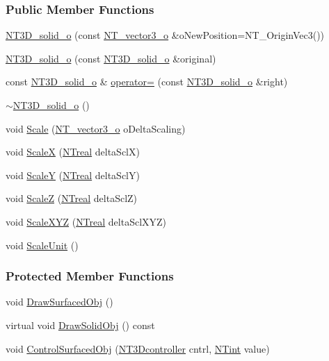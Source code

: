 \subsubsection*{Public Member Functions}
\begin{DoxyCompactItemize}
\item 
\hyperlink{class_n_t3_d__solid__o_a95fd6fbeb0b612c8076cb0bbf4b9b41e}{NT3D\_\-solid\_\-o} (const \hyperlink{class_n_t__vector3__o}{NT\_\-vector3\_\-o} \&oNewPosition=NT\_\-OriginVec3())
\item 
\hyperlink{class_n_t3_d__solid__o_a6c4325811642226e86ef613d57dd89b1}{NT3D\_\-solid\_\-o} (const \hyperlink{class_n_t3_d__solid__o}{NT3D\_\-solid\_\-o} \&original)
\item 
const \hyperlink{class_n_t3_d__solid__o}{NT3D\_\-solid\_\-o} \& \hyperlink{class_n_t3_d__solid__o_a4bd17ed59cee41950353aafa6dba9786}{operator=} (const \hyperlink{class_n_t3_d__solid__o}{NT3D\_\-solid\_\-o} \&right)
\item 
\hyperlink{class_n_t3_d__solid__o_ac68c10afb83bc16ecae8c220aa0496f8}{$\sim$NT3D\_\-solid\_\-o} ()
\item 
void \hyperlink{class_n_t3_d__solid__o_aecc87253889f4156016b15c83dda89d2}{Scale} (\hyperlink{class_n_t__vector3__o}{NT\_\-vector3\_\-o} oDeltaScaling)
\item 
void \hyperlink{class_n_t3_d__solid__o_a5aad20c85b01c4a562db53be7def3384}{ScaleX} (\hyperlink{nt__types_8h_a814a97893e9deb1eedcc7604529ba80d}{NTreal} deltaSclX)
\item 
void \hyperlink{class_n_t3_d__solid__o_a8194a6d58d5de0a57f431485ccc816e8}{ScaleY} (\hyperlink{nt__types_8h_a814a97893e9deb1eedcc7604529ba80d}{NTreal} deltaSclY)
\item 
void \hyperlink{class_n_t3_d__solid__o_a1b861d18dc390d54c77aea251340e6ef}{ScaleZ} (\hyperlink{nt__types_8h_a814a97893e9deb1eedcc7604529ba80d}{NTreal} deltaSclZ)
\item 
void \hyperlink{class_n_t3_d__solid__o_aa267835672fcd4e8f4e1cdc15caea030}{ScaleXYZ} (\hyperlink{nt__types_8h_a814a97893e9deb1eedcc7604529ba80d}{NTreal} deltaSclXYZ)
\item 
void \hyperlink{class_n_t3_d__solid__o_a8fc9ee1f5a5ecf7a6f734264020e5d5e}{ScaleUnit} ()
\end{DoxyCompactItemize}
\subsubsection*{Protected Member Functions}
\begin{DoxyCompactItemize}
\item 
void \hyperlink{class_n_t3_d__solid__o_ac0d1c364c4bd5100c9f529ee88f6c6ef}{DrawSurfacedObj} ()
\item 
virtual void \hyperlink{class_n_t3_d__solid__o_a131f24aa3f954f8f5242ae4cc87b2d86}{DrawSolidObj} () const 
\item 
void \hyperlink{class_n_t3_d__solid__o_a4d528008fd20f2e4837982bf08a5b1ab}{ControlSurfacedObj} (\hyperlink{nt3d__object__obj_8h_ae59ecf13a3631bc4a9ea41f90de08351}{NT3Dcontroller} cntrl, \hyperlink{nt__types_8h_aee8aa0a9869e8b5c97c6c02217ff09cd}{NTint} value)
\end{DoxyCompactItemize}
